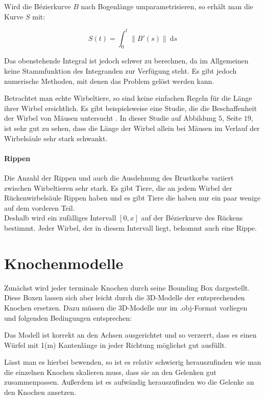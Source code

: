 Wird die Bézierkurve $B$ nach Bogenlänge umparametrisieren, so erhält man die Kurve $S$ mit:

\[S(t) = \int_0^t \| B'(s) \| ~\mathrm{d}s \]

Das obenstehende Integral ist jedoch schwer zu berechnen, da im Allgemeinen keine Stammfunktion des Integranden zur Verfügung steht. Es gibt jedoch numerische Methoden, mit denen das Problem gelöst werden kann. \cite{ArcLengthParametrization}

Betrachtet man echte Wirbeltiere, so sind keine einfachen Regeln für die Länge ihrer Wirbel ersichtlich. Es gibt beispielsweise eine Studie, die die Beschaffenheit der  Wirbel von Mäusen untersucht \cite{MouseVertebrae}. In dieser Studie auf Abbildung $5$, Seite $19$, ist sehr gut zu sehen, dass die Länge der Wirbel allein bei Mäusen im Verlauf der Wirbelsäule sehr stark schwankt.

\paragraph{Rippen}
Die Anzahl der Rippen und auch die Ausdehnung des Brustkorbs variiert zwischen Wirbeltieren sehr stark. Es gibt Tiere, die an jedem Wirbel der Rückenwirbelsäule Rippen haben und es gibt Tiere die haben nur ein paar wenige auf dem vorderen Teil.
\\
Deshalb wird ein zufälliges Intervall $[0, x]$ auf der Bézierkurve des Rückens bestimmt. Jeder Wirbel, der in diesem Intervall liegt, bekommt auch eine Rippe.


\section{Knochenmodelle}
\label{bone_models}

Zunächst wird jeder terminale Knochen durch seine Bounding Box dargestellt.
Diese Boxen lassen sich aber leicht durch die 3D-Modelle der entsprechenden Knochen ersetzen. Dazu müssen die 3D-Modelle nur im .obj-Format vorliegen und folgenden Bedingungen entsprechen:

Das Modell ist korrekt an den Achsen ausgerichtet und so verzerrt, dass es einen Würfel mit 1(m) Kantenlänge in jeder Richtung möglichst gut ausfüllt.

Lässt man es hierbei bewenden, so ist es relativ schwierig herauszufinden wie man die einzelnen Knochen skalieren muss, dass sie an den Gelenken gut zusammenpassen. Außerdem ist es aufwändig herauszufinden wo die Gelenke an den Knochen ansetzen.

